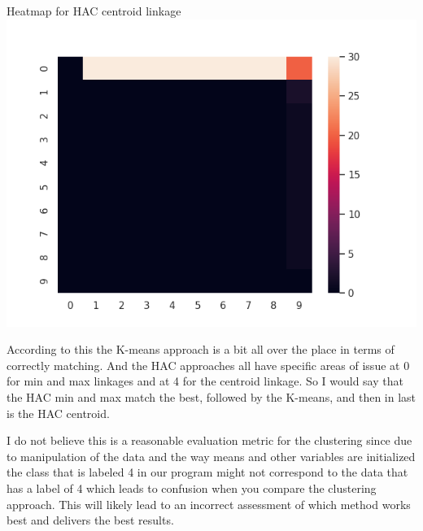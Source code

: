 \documentclass[submit]{harvardml}
\begin{document}
\begin{enumerate}
\begin{center}
    \newpage
    Heatmap for HAC centroid linkage\newline
    \includegraphics[scale=.70]{hw4/Pics/Part7_cent.png}\newline
    \end{center}
    According to this the K-means approach is a bit all over the place in terms of correctly matching. And the HAC approaches all have specific areas of issue at 0 for min and max linkages and at 4 for the centroid linkage. So I would say that the HAC min and max match the best, followed by the K-means, and then in last is the HAC centroid.
    
    I do not believe this is a reasonable evaluation metric for the clustering since due to manipulation of the data and the way means and other variables are initialized the class that is labeled 4 in our program might not correspond to the data that has a label of 4 which leads to confusion when you compare the clustering approach. This will likely lead to an incorrect assessment of which method works best and delivers the best results.
\end{enumerate}
\end{document}
